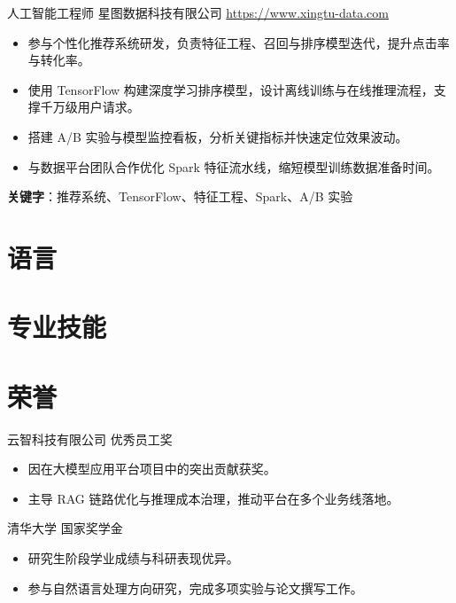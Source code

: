 \documentclass[a4paper, serif, 10pt]{moderncv}
\begin{document}
        {人工智能工程师}
        {星图数据科技有限公司}
        {\url{https://www.xingtu-data.com}}
        {}
        {\begin{itemize}
\item 参与个性化推荐系统研发，负责特征工程、召回与排序模型迭代，提升点击率与转化率。
\item 使用 TensorFlow 构建深度学习排序模型，设计离线训练与在线推理流程，支撑千万级用户请求。
\item 搭建 A/B 实验与模型监控看板，分析关键指标并快速定位效果波动。
\item 与数据平台团队合作优化 Spark 特征流水线，缩短模型训练数据准备时间。
\end{itemize}
\textbf{关键字}：推荐系统、TensorFlow、特征工程、Spark、A/B 实验}
\section{语言}

\section{专业技能}

\section{荣誉}

        {云智科技有限公司}
        {优秀员工奖}
        {}
        {}
        {\begin{itemize}
\item 因在大模型应用平台项目中的突出贡献获奖。
\item 主导 RAG 链路优化与推理成本治理，推动平台在多个业务线落地。
\end{itemize}}

        {清华大学}
        {国家奖学金}
        {}
        {}
        {\begin{itemize}
\item 研究生阶段学业成绩与科研表现优异。
\item 参与自然语言处理方向研究，完成多项实验与论文撰写工作。
\end{itemize}}
\end{document}
